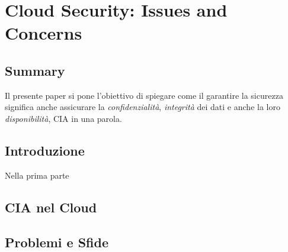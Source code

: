 \chapter{Cloud Security: Issues and Concerns}



\newpage


\section{Summary}
Il presente paper si pone l'obiettivo di spiegare come il garantire la sicurezza significa anche assicurare la \textit{confidenzialità}, \textit{integrità} dei dati e anche la loro \textit{disponibilità}, CIA in una parola.

\section{Introduzione}
Nella prima parte
\section{CIA nel Cloud}

\section{Problemi e Sfide}



